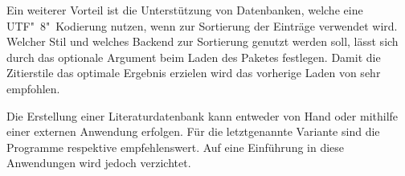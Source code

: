\documentclass[%
  english,ngerman,%
  geometry=no,DIV=12,automark,%
]{tudscrartcl}
\begin{document}
Ein weiterer Vorteil ist die Unterstützung von Datenbanken, welche eine 
UTF"~8"~Kodierung nutzen, wenn  zur Sortierung der Einträge 
verwendet wird. Welcher Stil und welches Backend zur Sortierung genutzt werden 
soll, lässt sich durch das optionale Argument beim Laden des Paketes festlegen. 
Damit die Zitierstile das optimale Ergebnis erzielen wird das vorherige Laden 
von  sehr empfohlen.
%
\begin{Preamble}
\usepackage{csquotes}
\usepackage[backend=biber,style=alphabetic]{biblatex}
\end{Preamble}
%
Die Erstellung einer Literaturdatenbank kann entweder von Hand oder mithilfe 
einer externen Anwendung erfolgen. Für die letztgenannte Variante sind die 
Programme  respektive  empfehlenswert. 
Auf eine Einführung in diese Anwendungen wird jedoch verzichtet. 
\end{document}
